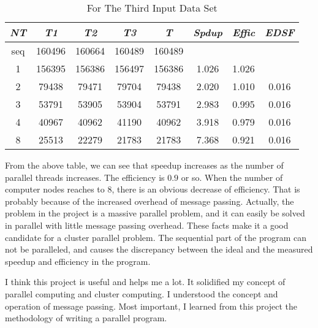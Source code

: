 \documentclass[12pt]{article}
\begin{document}

\begin{table}[htb]
\begin{center}
\begin{normalsize}
\caption{For The Third Input Data Set}
\begin {tabular} {|c|c|c|c|c|c|c|c|}
\hline 
\hline
{\em \bf NT} & {\em \bf T1} &{\em \bf T2}&{\em \bf T3}&{\em \bf T}&{\em \bf Spdup}&{\em \bf Effic}&{\em \bf EDSF}\\
\hline
seq&160496&160664&160489&160489&~&~&~\\
\hline
1&156395&156386&156497&156386&1.026&1.026&~\\
\hline
2&79438&79471&79704&79438&2.020&1.010&0.016\\
\hline
3&53791&53905&53904&53791&2.983&0.995&0.016\\
\hline
4&40967&40962&41190&40962&3.918&0.979&0.016\\
\hline
8&25513&22279&21783&21783&7.368&0.921&0.016\\
\hline
\end {tabular}
\end{normalsize}
\end{center}
\end {table}
From the above table, we can see that speedup increases as the number of parallel threads increases. The efficiency is $0.9$ or so. When the number of computer nodes reaches to 8, there is  an obvious decrease of efficiency. That is probably because of the increased overhead of message passing. Actually, the problem in the project is a massive parallel problem, and it can easily be solved in parallel with little message passing overhead. These facts make it a good candidate for a cluster parallel problem. The sequential part of the program can not be paralleled, and causes the discrepancy between the ideal and the measured speedup and efficiency in the program.    

I think this project is useful and helps me a lot. It solidified my concept of parallel computing and cluster computing. I understood the concept and operation of message passing. Most important, I learned from this project the methodology of writing a parallel program. 
\end{document}
